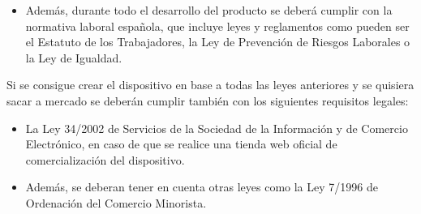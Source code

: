 \begin{itemize}
    \item Además, durante todo el desarrollo del producto se deberá cumplir con la normativa laboral española\cite{normaLaboral}, que incluye leyes y reglamentos como pueden ser el Estatuto de los Trabajadores, la Ley de Prevención de Riesgos Laborales o la Ley de Igualdad.
    
\end{itemize}

Si se consigue crear el dispositivo en base a todas las leyes anteriores y se quisiera sacar a mercado se deberán cumplir también con los siguientes requisitos legales:
\begin{itemize}
    \item La Ley 34/2002\cite{comercioElectronico} de Servicios de la Sociedad de la Información y de Comercio Electrónico, en caso de que se realice una tienda web oficial de comercialización del dispositivo.
    
    \item Además, se deberan tener en cuenta otras leyes\cite{comercio} como la Ley 7/1996\cite{comercioMinorista} de Ordenación del Comercio Minorista.
\end{itemize}

